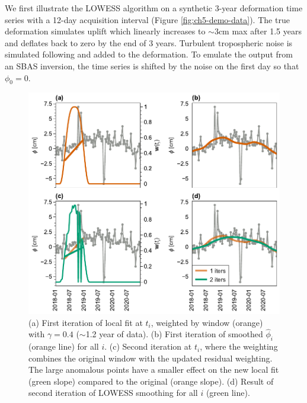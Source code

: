 We first illustrate the LOWESS algorithm on a synthetic 3-year deformation time series with a 12-day acquisition interval (Figure \ref{fig:ch5-demo-data}).
The true deformation simulates uplift which linearly increases to $ \sim3 $cm max after 1.5 years and deflates back to zero by the end of 3 years. 
Turbulent tropospheric noise is simulated following \cite{Hanssen2001RadarInterferometryData} and added to the deformation.
To emulate the output from an SBAS inversion, the time series is shifted by the noise on the first day so that $ \phi_0 = 0 $.



\begin{figure}
	\centering
	\includegraphics[width=.99\textwidth]{figures/chapter5-lowess/figure3-fits.pdf}
	\caption[Demo of LOWESS fitting]{
		(a) First iteration of local fit at $t_i$, weighted by window (orange) with $ \gamma=0.4 $ ($ \sim $1.2 year of data). 
		(b) First iteration of smoothed $ \hat{\phi}_i $ (orange line) for all $i$. 
		(c) Second iteration at $t_i$, where the weighting combines the original window with the updated residual weighting. The large anomalous points have a smaller effect on the new local fit (green slope) compared to the original (orange slope).
		(d) Result of second iteration of LOWESS smoothing for all $i$ (green line).
	}
	\label{fig:ch5-algo-demo}
\end{figure}



